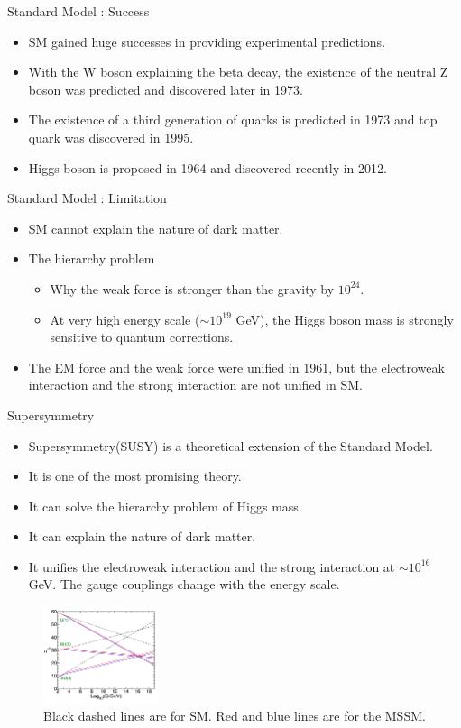 \documentclass[mathserif,serif]{beamer}
\begin{document}
\begin{frame}{Standard Model : Success}
\begin{itemize}
\item SM gained huge successes in providing experimental predictions.
\item With the W boson explaining the beta decay, the existence of the neutral Z boson was predicted and discovered later in 1973.
\item The existence of a third generation of quarks is predicted in 1973 and top quark was discovered in 1995.
\item Higgs boson is proposed in 1964 and discovered recently in 2012.
\end{itemize}
\end{frame}

\begin{frame}{Standard Model : Limitation}
\begin{itemize}
\item SM cannot explain the nature of dark matter.
\item The hierarchy problem
\begin{itemize}
\item Why the weak force is stronger than the gravity by $10^{24}$.
\item At very high energy scale ($\sim 10^{19}$ GeV), the Higgs boson mass is strongly sensitive to quantum corrections.
\end{itemize}
\item The EM force and the weak force were unified in 1961, but the electroweak interaction and the strong interaction are not unified in SM.
\end{itemize}
\end{frame}

\begin{frame}{Supersymmetry}
\begin{itemize}
\item Supersymmetry(SUSY) is a theoretical extension of the Standard Model.
\item It is one of the most promising theory.
\item It can solve the hierarchy problem of Higgs mass.
\item It can explain the nature of dark matter.
\item It unifies the electroweak interaction and the strong interaction at $\sim 10^{16}$ GeV. The gauge couplings change with the energy scale.
\end{itemize}
\begin{figure}
\centering
\includegraphics[width=0.3\textwidth]{data/photo/theory/unification.png}
\caption{Black dashed lines are for SM. Red and blue lines are for the MSSM.}
\end{figure}
\end{frame}
\end{document}

